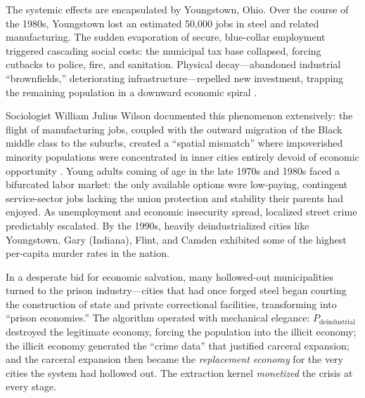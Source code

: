 The systemic effects are encapsulated by Youngstown, Ohio. Over the course of the 1980s, Youngstown lost an estimated 50,000 jobs in steel and related manufacturing. The sudden evaporation of secure, blue-collar employment triggered cascading social costs: the municipal tax base collapsed, forcing cutbacks to police, fire, and sanitation. Physical decay---abandoned industrial ``brownfields,'' deteriorating infrastructure---repelled new investment, trapping the remaining population in a downward economic spiral \cite{wilson_wj}.

Sociologist William Julius Wilson documented this phenomenon extensively: the flight of manufacturing jobs, coupled with the outward migration of the Black middle class to the suburbs, created a ``spatial mismatch'' where impoverished minority populations were concentrated in inner cities entirely devoid of economic opportunity \cite{wilson_wj}. Young adults coming of age in the late 1970s and 1980s faced a bifurcated labor market: the only available options were low-paying, contingent service-sector jobs lacking the union protection and stability their parents had enjoyed. As unemployment and economic insecurity spread, localized street crime predictably escalated. By the 1990s, heavily deindustrialized cities like Youngstown, Gary (Indiana), Flint, and Camden exhibited some of the highest per-capita murder rates in the nation.

In a desperate bid for economic salvation, many hollowed-out municipalities turned to the prison industry---cities that had once forged steel began courting the construction of state and private correctional facilities, transforming into ``prison economies.'' The algorithm operated with mechanical elegance: $P_{\text{deindustrial}}$ destroyed the legitimate economy, forcing the population into the illicit economy; the illicit economy generated the ``crime data'' that justified carceral expansion; and the carceral expansion then became the \textit{replacement economy} for the very cities the system had hollowed out. The extraction kernel \textit{monetized} the crisis at every stage.

